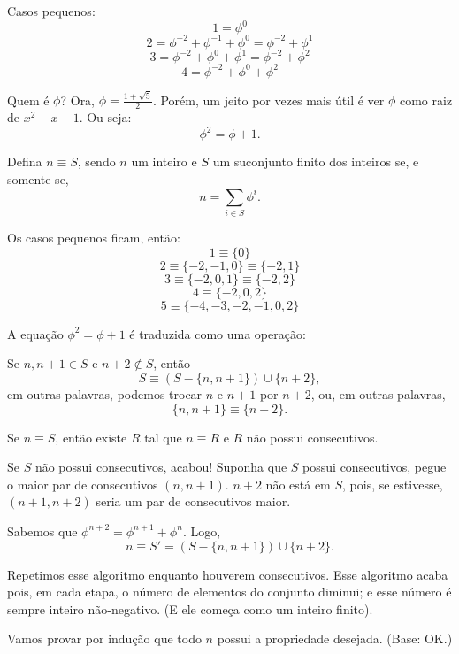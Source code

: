 \documentclass[11pt,a4paper]{article}
\begin{document}
	\newpage

	\begin{sk}
		Casos pequenos:
			\[1 = \phi^0\]
			\[2 = \phi^{-2} + \phi^{-1} + \phi^{0} = \phi^{-2} + \phi^1 \]
			\[3 = \phi^{-2} + \phi^0 + \phi^1 = \phi^{-2} + \phi^2\]
			\[4 = \phi^{-2} + \phi^0 + \phi^2\]

		Quem é $\phi$? Ora, $\phi = \frac{1 + \sqrt{5}}{2}$. Porém, um jeito por vezes mais útil é ver $\phi$ como raiz de $x^2 - x - 1$. Ou seja:
		\[\phi^2 = \phi + 1.\]
	\end{sk}

	\begin{sol}
		Defina $n \equiv S$, sendo $n$ um inteiro e $S$ um suconjunto finito dos inteiros se, e somente se, \[n = \sum_{i \in S} \phi^i.\]

		Os casos pequenos ficam, então:
		\[1 \equiv \{0\}\]
		\[2 \equiv \{-2, -1, 0\} \equiv \{-2, 1\}\]
		\[3 \equiv \{-2, 0, 1\} \equiv \{-2, 2\}\]
		\[4 \equiv \{-2, 0, 2\}\]
		\[5 \equiv \{-4, -3, -2, -1, 0, 2\}\]

		A equação $\phi^2 = \phi + 1$ é traduzida como uma operação:

		Se $n, n+1 \in S$ e $n+2 \not\in S$, então \[S \equiv (S - \{ n, n+1\}) \cup \{n+2\},\]
		em outras palavras, podemos trocar $n$ e $n+1$ por $n+2$, ou, em outras palavras, \[\{n, n+1\} \equiv \{n+2\}.\]

		\begin{lem}
			Se $n \equiv S$, então existe $R$ tal que $n \equiv R$ e $R$ não possui consecutivos.
		\end{lem}
		\begin{dem}	
			Se $S$ não possui consecutivos, acabou! Suponha que $S$ possui consecutivos, pegue o maior par de consecutivos $(n, n+1)$.  $n+2$ não está em $S$, pois, se estivesse, $(n+1, n+2)$ seria um par de consecutivos maior.

			Sabemos que $\phi^{n+2} = \phi^{n+1} + \phi^n$.
			Logo, \[n \equiv S' = (S - \{n, n+1\}) \cup \{ n+2\}.\]

			Repetimos esse algoritmo enquanto houverem consecutivos. Esse algoritmo acaba pois, em cada etapa, o número de elementos do conjunto diminui; e esse número é sempre inteiro não-negativo. (E ele começa como um inteiro finito).
		\end{dem}

		Vamos provar por indução que todo $n$ possui a propriedade desejada. (Base: OK.)


\end{sol}
\end{document}
